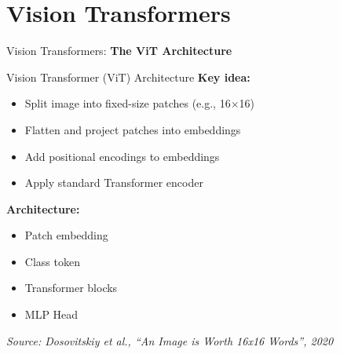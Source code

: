 \section{Vision Transformers}
\begin{frame}{}
    \LARGE Vision Transformers: \textbf{The ViT Architecture}
\end{frame}

\begin{frame}{Vision Transformer (ViT) Architecture}
    \textbf{Key idea:}
    \begin{itemize}
        \item Split image into fixed-size patches (e.g., 16$\times$16)
        \item Flatten and project patches into embeddings
        \item Add positional encodings to embeddings
        \item Apply standard Transformer encoder
    \end{itemize}
    \vspace{0.5em}
    \textbf{Architecture:}
    \begin{itemize}
        \item Patch embedding
        \item Class token
        \item Transformer blocks
        \item MLP Head
    \end{itemize}
    {\footnotesize\textit{Source: Dosovitskiy et al., ``An Image is Worth 16x16 Words'', 2020}}
\end{frame}

